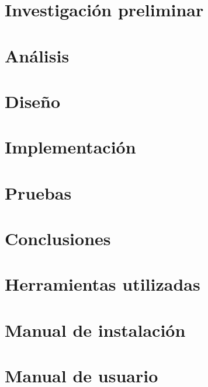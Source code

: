 \documentclass[a4paper,12pt]{scrbook}
\begin{document}
\chapter{Investigación preliminar}


\chapter{Análisis}


\chapter{Diseño}


\chapter{Implementación}


\chapter{Pruebas}


\chapter{Conclusiones}


\appendix

\chapter{Herramientas utilizadas}


\chapter{Manual de instalación}
\label{sec:maninstalacion}


\chapter{Manual de usuario}
\label{chap:manual_usuario}

\end{document}
